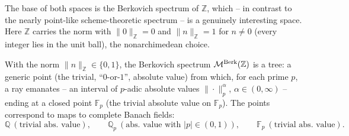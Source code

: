 The base of both spaces is the Berkovich spectrum of $\mathbb{Z}$, which -- in
contrast to the nearly point-like scheme-theoretic spectrum -- is a genuinely
interesting space. Here $\mathbb{Z}$ carries the norm with $\|0\|_{\mathbb{Z}}=0$
and $\|n\|_{\mathbb{Z}}=1$ for $n\ne0$ (every integer lies in the unit ball), the
nonarchimedean choice.

\begin{proposition}
\label{prop:12:berkovich-Z}
With the norm $\|n\|_{\mathbb{Z}}\in\{0,1\}$, the Berkovich spectrum
$\mathcal{M}^{\mathrm{Berk}}(\mathbb{Z})$ is a tree: a generic point (the trivial, ``$0$-or-$1$'',
absolute value) from which, for each prime $p$, a ray emanates -- an interval
of $p$-adic absolute values $\|\cdot\|_p^{\alpha}$, $\alpha\in(0,\infty)$ --
ending at a closed point $\mathbb{F}_p$ (the trivial absolute value on
$\mathbb{F}_p$). The points correspond to maps to complete Banach fields:
\begin{equation*}
\mathbb{Q}\ (\text{trivial abs. value}),\qquad
\mathbb{Q}_p\ (\text{abs. value with } |p|\in(0,1)),\qquad
\mathbb{F}_p\ (\text{trivial abs. value}).
\end{equation*}
\end{proposition}

\begin{center}
\end{center}

